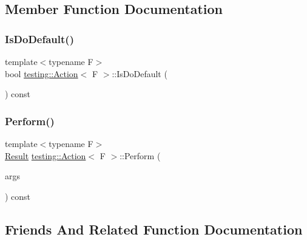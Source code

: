 \subsection{Member Function Documentation}
\mbox{\label{classtesting_1_1_action_a4468ca2ea5e9f7363271145992d09dba}} 
\subsubsection{\texorpdfstring{Is\+Do\+Default()}{IsDoDefault()}}
{\footnotesize\ttfamily template$<$typename F$>$ \\
bool \hyperlink{classtesting_1_1_action}{testing\+::\+Action}$<$ F $>$\+::Is\+Do\+Default (\begin{DoxyParamCaption}{ }\end{DoxyParamCaption}) const\hspace{0.3cm}{\ttfamily [inline]}}

\mbox{\label{classtesting_1_1_action_ad00a03062885685da84b308e6e8ff4cb}} 
\subsubsection{\texorpdfstring{Perform()}{Perform()}}
{\footnotesize\ttfamily template$<$typename F$>$ \\
\hyperlink{classtesting_1_1_action_a9af08a21ad329331fde856cba9b6dea2}{Result} \hyperlink{classtesting_1_1_action}{testing\+::\+Action}$<$ F $>$\+::Perform (\begin{DoxyParamCaption}\item[{const \hyperlink{classtesting_1_1_action_ae27fda510696a9294f991de5b1abfaf2}{Argument\+Tuple} \&}]{args }\end{DoxyParamCaption}) const\hspace{0.3cm}{\ttfamily [inline]}}



\subsection{Friends And Related Function Documentation}
\mbox{\label{classtesting_1_1_action_a66fe4f9c9b9d020273151aa6054b491e}} 
